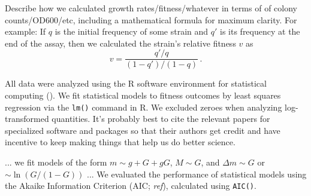 \documentclass[11pt]{article}
\begin{document}
Describe how we calculated growth rates/fitness/whatever in terms of of colony counts/OD600/etc, including a mathematical formula for maximum clarity. For example: If $q$ is the initial frequency of some strain and $q'$ is its frequency at the end of the assay, then we calculated the strain's relative fitness $v$ as
\begin{equation*}
	v = \frac{q'/q}{(1-q')/(1-q)} \, .
\end{equation*}

All data were analyzed using the R software environment for statistical computing (). 
We fit statistical models to fitness outcomes by least squares regression via the \texttt{lm()} command in R. We excluded zeroes when analyzing log-transformed quantities. It's probably best to cite the relevant papers for specialized software and packages so that their authors get credit and have incentive to keep making things that help us do better science.

... we fit models of the form $m \sim g + G + gG$, $M \sim G$, and $\Delta m \sim G$ or $\sim \ln(G/(1-G))$ ... We evaluated the performance of statistical models using the Akaike Information Criterion (AIC; \textit{ref}), calculated using \texttt{AIC()}. 
\end{document}
